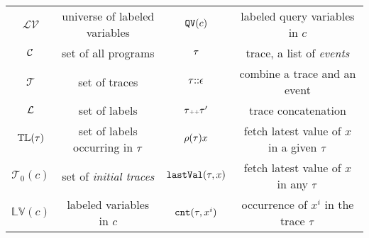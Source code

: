    \begin{table}
      \caption{}
      \label{tb:notation}
      \begin{center}
        \begin{tabular}{| c |c |c| c| }
          \hline 
          $\mathcal{LV}$   & universe of labeled variables  & $\mathtt{QV}(c)$ & labeled query variables in $c$\\ 
          $\mathcal{C}$  & set of all programs &  $\mathtt{\tau}$ &   trace, a list of \emph{events}\\  
          $\mathcal{T}$  &  set of traces &  $\mathtt{\tau} {\small ::} \mathtt{\epsilon}$  & combine a trace and an event  \\
          $\mathcal{L}$ & set of labels  & $\mathtt{\tau} {\scriptscriptstyle ++} \mathtt{\tau}'$ &  trace concatenation \\
          $\mathbb{TL}(\mathtt{\tau}) $  &set of labels occurring in $\mathtt{\tau}$  &  $ \rho (\mathtt{\tau}) x$  & fetch latest value of  $x$ in a given $\mathtt{\tau}$ \\
          $\mathcal{T}_0(c) $ &  set of \emph{initial traces} & $\mathtt{lastVal} (\mathtt{\tau}, x)$  & fetch latest value of  $x$ in any $\mathtt{\tau}$\\
          $\mathbb{LV}(c)$  & labeled variables in $c$ & $\mathtt{cnt}(\mathtt{\tau}, x^i)$ & occurrence of $x^i$ in the trace $\mathtt{\tau}$\\
          \hline 
        \end{tabular}
        \end{center}
        \vspace{-0.3cm}
      \end{table}
